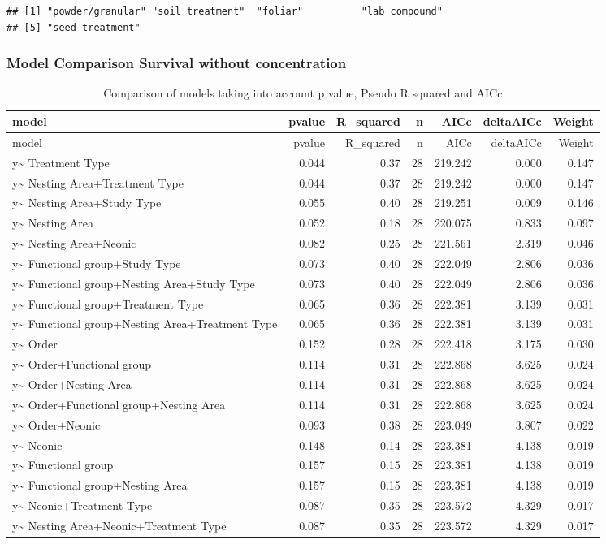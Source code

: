 \documentclass[]{elsarticle} %
\begin{document}
\begin{verbatim}
## [1] "powder/granular" "soil treatment"  "foliar"          "lab compound"   
## [5] "seed treatment"
\end{verbatim}

\subsubsection{Model Comparison Survival without
concentration}\label{model-comparison-survival-without-concentration}

\begin{longtable}[c]{@{}lrrrrrr@{}}
\caption{Comparison of models taking into account p value, Pseudo R
squared and AICc}\tabularnewline
\toprule
model & pvalue & R\_squared & n & AICc & deltaAICc &
Weight\tabularnewline
\midrule
\endfirsthead
\toprule
model & pvalue & R\_squared & n & AICc & deltaAICc &
Weight\tabularnewline
\midrule
\endhead
y\textasciitilde{} Treatment Type & 0.044 & 0.37 & 28 & 219.242 & 0.000
& 0.147\tabularnewline
y\textasciitilde{} Nesting Area+Treatment Type & 0.044 & 0.37 & 28 &
219.242 & 0.000 & 0.147\tabularnewline
y\textasciitilde{} Nesting Area+Study Type & 0.055 & 0.40 & 28 & 219.251
& 0.009 & 0.146\tabularnewline
y\textasciitilde{} Nesting Area & 0.052 & 0.18 & 28 & 220.075 & 0.833 &
0.097\tabularnewline
y\textasciitilde{} Nesting Area+Neonic & 0.082 & 0.25 & 28 & 221.561 &
2.319 & 0.046\tabularnewline
y\textasciitilde{} Functional group+Study Type & 0.073 & 0.40 & 28 &
222.049 & 2.806 & 0.036\tabularnewline
y\textasciitilde{} Functional group+Nesting Area+Study Type & 0.073 &
0.40 & 28 & 222.049 & 2.806 & 0.036\tabularnewline
y\textasciitilde{} Functional group+Treatment Type & 0.065 & 0.36 & 28 &
222.381 & 3.139 & 0.031\tabularnewline
y\textasciitilde{} Functional group+Nesting Area+Treatment Type & 0.065
& 0.36 & 28 & 222.381 & 3.139 & 0.031\tabularnewline
y\textasciitilde{} Order & 0.152 & 0.28 & 28 & 222.418 & 3.175 &
0.030\tabularnewline
y\textasciitilde{} Order+Functional group & 0.114 & 0.31 & 28 & 222.868
& 3.625 & 0.024\tabularnewline
y\textasciitilde{} Order+Nesting Area & 0.114 & 0.31 & 28 & 222.868 &
3.625 & 0.024\tabularnewline
y\textasciitilde{} Order+Functional group+Nesting Area & 0.114 & 0.31 &
28 & 222.868 & 3.625 & 0.024\tabularnewline
y\textasciitilde{} Order+Neonic & 0.093 & 0.38 & 28 & 223.049 & 3.807 &
0.022\tabularnewline
y\textasciitilde{} Neonic & 0.148 & 0.14 & 28 & 223.381 & 4.138 &
0.019\tabularnewline
y\textasciitilde{} Functional group & 0.157 & 0.15 & 28 & 223.381 &
4.138 & 0.019\tabularnewline
y\textasciitilde{} Functional group+Nesting Area & 0.157 & 0.15 & 28 &
223.381 & 4.138 & 0.019\tabularnewline
y\textasciitilde{} Neonic+Treatment Type & 0.087 & 0.35 & 28 & 223.572 &
4.329 & 0.017\tabularnewline
y\textasciitilde{} Nesting Area+Neonic+Treatment Type & 0.087 & 0.35 &
28 & 223.572 & 4.329 & 0.017\tabularnewline
\bottomrule
\end{longtable}
\end{document}
